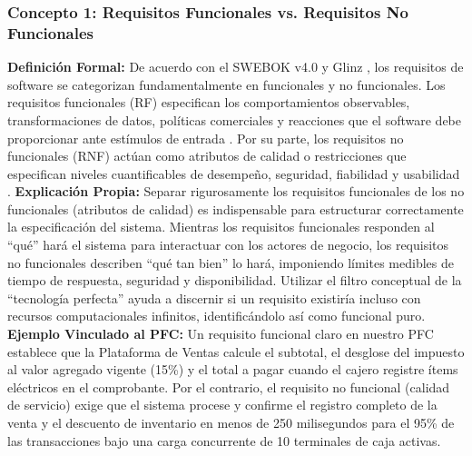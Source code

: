 \documentclass[conference,10pt]{IEEEtran}
\begin{document}
	\subsubsection{Concepto 1: Requisitos Funcionales vs. Requisitos No Funcionales}
	\textbf{Definición Formal:} De acuerdo con el SWEBOK v4.0 \cite{swebok2024} y Glinz \cite{glinz2007nfr}, los requisitos de software se categorizan fundamentalmente en funcionales y no funcionales. Los requisitos funcionales (RF) especifican los comportamientos observables, transformaciones de datos, políticas comerciales y reacciones que el software debe proporcionar ante estímulos de entrada \cite{pohl2025, swebok2024}. Por su parte, los requisitos no funcionales (RNF) actúan como atributos de calidad o restricciones que especifican niveles cuantificables de desempeño, seguridad, fiabilidad y usabilidad \cite{iso25010, glinz2007nfr}.
	\textbf{Explicación Propia:} Separar rigurosamente los requisitos funcionales de los no funcionales (atributos de calidad) es indispensable para estructurar correctamente la especificación del sistema. Mientras los requisitos funcionales responden al ``qué'' hará el sistema para interactuar con los actores de negocio, los requisitos no funcionales describen ``qué tan bien'' lo hará, imponiendo límites medibles de tiempo de respuesta, seguridad y disponibilidad. Utilizar el filtro conceptual de la ``tecnología perfecta'' ayuda a discernir si un requisito existiría incluso con recursos computacionales infinitos, identificándolo así como funcional puro.
	\textbf{Ejemplo Vinculado al PFC:} Un requisito funcional claro en nuestro PFC establece que la Plataforma de Ventas calcule el subtotal, el desglose del impuesto al valor agregado vigente (15\%) y el total a pagar cuando el cajero registre ítems eléctricos en el comprobante. Por el contrario, el requisito no funcional (calidad de servicio) exige que el sistema procese y confirme el registro completo de la venta y el descuento de inventario en menos de 250 milisegundos para el 95\% de las transacciones bajo una carga concurrente de 10 terminales de caja activas.
\end{document}

